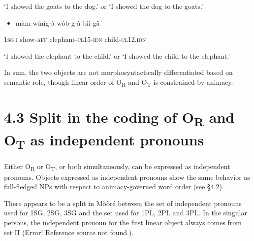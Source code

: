 \documentclass[output=paper]{langsci/langscibook}
\begin{document}
{{\begin{styleTranslation}
‘I showed the goats to the dog.’ or ‘I showed the dog to the goats.’  
\end{styleTranslation}

\begin{itemize}
\item \begin{styleNumberedEX}
\label{bkm:Ref424143137}m\`{a}m    w\'{i}n\'{i}g-\`{a}    w\'{o}b-g-\`{a}    bii-g\~{a}\`{ }
\end{styleNumberedEX}\end{itemize}
\begin{styleGloss}
\textsc{1sg.i  }  show-\textsc{aff}    elephant-\textsc{cl15-idn}  child-\textsc{cl12.idn}
\end{styleGloss}

\begin{styleTranslation}
‘I showed the elephant to the child.’ or ‘I showed the child to the elephant.’
\end{styleTranslation}

In sum, the two objects are not morphosyntactically differentiated based on semantic role, though linear order of O\textsubscript{R} and O\textsubscript{T }is constrained by animacy.

\section{4.3 Split in the coding of O\textsubscript{R} and O\textsubscript{T} as independent pronouns}

Either O\textsubscript{R} or O\textsubscript{T}, or both simultaneously, can be expressed as independent pronouns. Objects expressed as independent pronouns show the same behavior as full-fledged NPs with respect to animacy-governed word order (see §4.2). 

There appears to be a split in M\`{o}\`{o}r\'{e} between the set of independent pronouns used for 1SG, 2SG, 3SG and the set used for 1PL, 2PL and 3PL. In the singular persons, the independent pronoun for the first linear object always comes from set II (Error! Reference source not found.). 

}}
\end{document}

